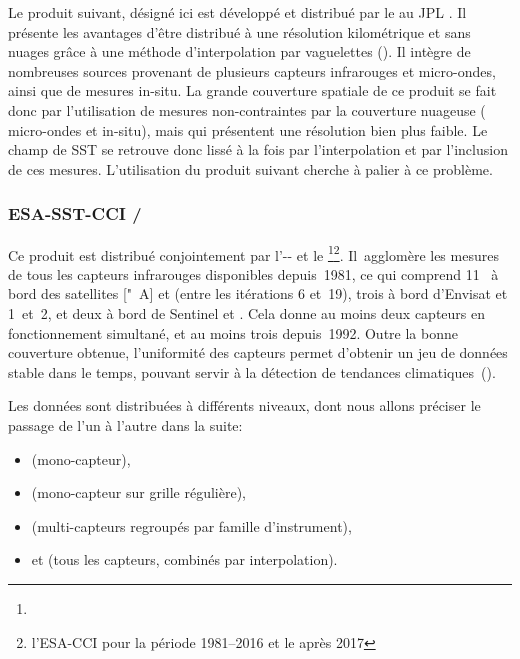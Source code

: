 Le produit suivant, désigné ici  est développé et distribué par le  au JPL  .
Il présente les avantages d'être distribué à une résolution kilométrique et sans nuages grâce à une méthode d'interpolation par vaguelettes (\cite{chin_2017}).
Il intègre de nombreuses sources provenant de plusieurs capteurs infrarouges et micro-ondes, ainsi que de mesures in-situ.
La grande couverture spatiale de ce produit se fait donc par l'utilisation de mesures non-contraintes par la couverture nuageuse ( micro-ondes et in-situ), mais qui présentent une résolution bien plus faible.
Le champ de SST se retrouve donc lissé à la fois par l'interpolation et par l'inclusion de ces mesures.
L'utilisation du produit suivant cherche à palier à ce problème.

\subsubsection{ESA-SST-CCI / }

Ce produit est distribué conjointement par l'-- et le \footnote{}\multfootsep\footnote{%
  l'ESA-CCI pour la période 1981--2016 et le  après 2017
}.
Il~agglomère les mesures de tous les capteurs infrarouges disponibles depuis~1981, ce qui comprend 11~ à bord des satellites ["~A] et  (entre les itérations 6 et~19), trois  à bord d'Envisat et  1~et~2, et deux  à bord de Sentinel  et .
Cela donne au moins deux capteurs en fonctionnement simultané, et au moins trois depuis~1992.
Outre la bonne couverture obtenue, l'uniformité des capteurs permet d'obtenir un jeu de données stable dans le temps, pouvant servir à la détection de tendances climatiques~(\cite{merchant_2019}).

Les données sont distribuées à différents niveaux, dont nous allons préciser le passage de l'un à l'autre dans la suite:
\begin{itemize}
  \item {} (mono-capteur),
  \item {} (mono-capteur sur grille régulière),
  \item {} (multi-capteurs regroupés par famille d'instrument),
  \item et  (tous les capteurs, combinés par interpolation).
\end{itemize}

